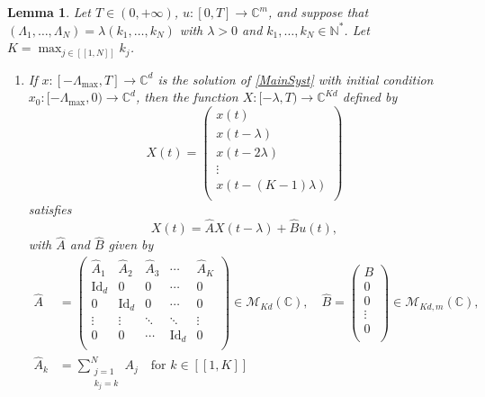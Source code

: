 \documentclass[JEP,XML,SOM,Unicode]{cedram}
\newcommand{\llbracket}{[\![}
\newcommand{\rrbracket}{]\!]}
\theoremstyle{plain}
\newtheorem{lemm}[theo]{Lemma}
\theoremstyle{definition}
\DeclareMathOperator{\id}{Id}
\begin{document}
\begin{lemm}
\label{LemmAAugm}
Let $T \in (0, +\infty)$, $u: [0, T] \to \mathbb C^m$, and suppose that $(\Lambda_1, \dots, \Lambda_N) = \lambda (k_1, \dots, k_N)$ with $\lambda > 0$ and $k_1, \dots,  k_N \in \mathbb N^\ast$. Let $K = \max_{j \in \llbracket 1, N\rrbracket} k_j$.
\begin{enumerate}
\item If $x: [-\Lambda_{\max}, T] \to \mathbb C^d$ is the solution of \eqref{MainSyst} with initial condition $x_0: [-\Lambda_{\max}, 0) \to \mathbb C^d$, then the function $X: [-\lambda, T) \to \mathbb C^{K d}$ defined by
\begin{equation}
\label{AugmX}
X(t) = \begin{pmatrix}
x(t) \\
x(t - \lambda) \\
x(t - 2\lambda) \\
\vdots \\
x(t - (K-1)\lambda) \\
\end{pmatrix}
\end{equation}
satisfies
\begin{equation}
\label{AugmSyst}
X(t) = \widehat A X(t - \lambda) + \widehat B u(t),
\end{equation}
with $\widehat A$ and $\widehat B$ given by
\begin{equation}
\label{AugmMat}
\begin{aligned}
\widehat A & = \begin{pmatrix}
\widehat A_1 & \widehat A_2 & \widehat A_3 & \cdots & \widehat A_K \\
\id_d & 0 & 0 & \cdots & 0 \\
0 & \id_d & 0 & \cdots & 0 \\
\vdots & \vdots & \ddots & \ddots & \vdots \\
0 & 0 & \cdots & \id_d & 0 \\
\end{pmatrix} \in \mathcal M_{Kd}(\mathbb C), \quad \widehat B = \begin{pmatrix}
B \\
0 \\
0 \\
\vdots \\
0 \\
\end{pmatrix} \in \mathcal M_{K d, m}(\mathbb C),\\
\widehat A_k & = \sum_{\substack{j = 1 \\ k_j = k}}^N A_j \quad \text{for } k \in \llbracket 1, K\rrbracket\\[-18pt]

\end{aligned}
\end{equation}
\end{enumerate}
\end{lemm}
\end{document}
